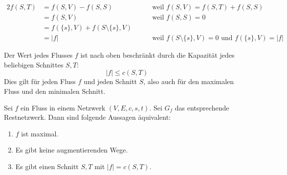 \begin{Bew}
  \begin{alignat*}{2}
    f(S,T) &= f(S, V) - f(S,S) &\quad& \text{ weil } f(S,V) = f(S,T) + f(S,S)\\
           &= f(S, V) && \text{ weil } f(S,S) = 0\\
           &= f(\{s\}, V) + f(S \setminus \{s\}, V)\\
           & = |f| && \text{ weil } f(S \setminus \{s\}, V) = 0 \text{ und } f(\{s\}, V) = |f|
  \end{alignat*}
\end{Bew}

\begin{Koro}
  \hspace{\parindent}Der Wert jedes Flusses $f$ ist nach oben beschränkt durch die Kapazität jedes beliebigen Schnittes $S, T$:
  \[ |f| \le c(S,T) \]
  Dies gilt für jeden Fluss $f$ und jeden Schnitt $S$, also auch für den maximalen Fluss und den minimalen Schnitt.
\end{Koro}

\begin{Satz}
  \hspace{\parindent}Sei $f$ ein Fluss in einem Netzwerk $(V, E, c, s, t)$. Sei $G_f$ das entsprechende Restnetzwerk. Dann sind folgende Aussagen äquivalent:
  \begin{enumerate}
    \item \label{kap4SatzMaxFMinS:fMax} $f$ ist maximal.
    \item \label{kap4SatzMaxFMinS:augWeg} Es gibt keine augmentierenden Wege.
    \item \label{kap4SatzMaxFMinS:minS} Es gibt einen Schnitt $S,T$ mit $|f| = c(S,T)$.
  \end{enumerate}
\end{Satz}

